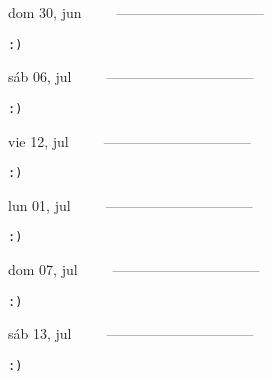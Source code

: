 \documentclass[letterpaper,10pt]{article}
\begin{document}
\begin{multicols}{3}
{dom 30, jun\ \ \ \ \ --------------------------------}
\begin{flushright}\begin{small}\texttt{:)}\end{small}\end{flushright}
\vfill
{sáb 06, jul\ \ \ \ \ --------------------------------}
\begin{flushright}\begin{small}\texttt{:)}\end{small}\end{flushright}\par
\vfill
{vie 12, jul\ \ \ \ \ --------------------------------}
\begin{flushright}\begin{small}\texttt{:)}\end{small}\end{flushright}\par
\vfill
\end{multicols}
\vspace{1.05cm}

\begin{multicols}{3}
{lun 01, jul\ \ \ \ \ --------------------------------}
\begin{flushright}\begin{small}\texttt{:)}\end{small}\end{flushright}
\vfill
{dom 07, jul\ \ \ \ \ --------------------------------}
\begin{flushright}\begin{small}\texttt{:)}\end{small}\end{flushright}\par
\vfill
{sáb 13, jul\ \ \ \ \ --------------------------------}
\begin{flushright}\begin{small}\texttt{:)}\end{small}\end{flushright}\par
\vfill
\end{multicols}
\vspace{1.05cm}
\end{document}
